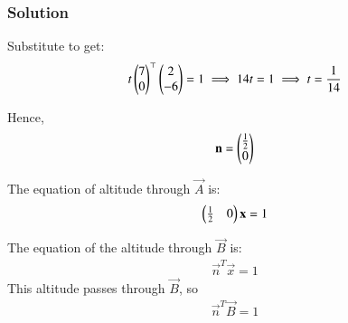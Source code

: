 \documentclass{beamer}
\numberwithin{equation}{section}
\begin{document}
\begin{frame}[fragile]
    \frametitle{Solution}
Substitute to get:
\begin{align}
t \begin{pmatrix}7 \\ 0\end{pmatrix}^\top \begin{pmatrix}2 \\ -6\end{pmatrix} = 1 \implies 14 t = 1 \implies t = \frac{1}{14}
\end{align}

Hence,
\begin{align}
\mathbf{n} = \begin{pmatrix}\frac{1}{2} \\ 0\end{pmatrix}
\end{align}

The equation of altitude through \( \vec{A} \) is:
\begin{align}
\begin{pmatrix}\frac{1}{2} & 0\end{pmatrix} \mathbf{x} = 1
\end{align}

\vspace{1em}

The equation of the altitude through \( \vec{B} \) is:
\begin{align}
\vec{n}^T \vec{x} = 1
\end{align}
This altitude passes through \( \vec{B} \), so
\begin{align}
\vec{n}^T \vec{B} = 1
\end{align}
\end{frame}
\end{document}
